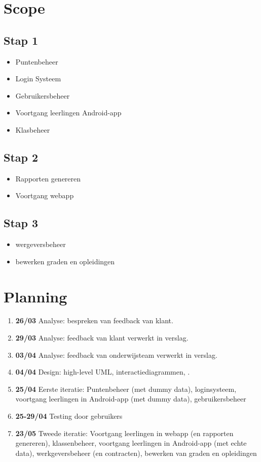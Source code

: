 \documentclass[a4paper]{article}
\begin{document}
\newpage
\section{Scope}
\subsection{Stap 1} %
\begin{itemize} 
    \item Puntenbeheer
    \item Login Systeem
    \item Gebruikersbeheer
    \item Voortgang leerlingen Android-app
    \item Klasbeheer
\end{itemize}
\subsection{Stap 2}
\begin{itemize}
    \item Rapporten genereren
    \item Voortgang webapp 
\end{itemize}
\subsection{Stap 3}
\begin{itemize}
    \item wergeversbeheer
    \item bewerken graden en opleidingen
\end{itemize}


\section{Planning}
\begin{enumerate}
    \item \textbf{26/03} Analyse: bespreken van feedback van klant.
    \item \textbf{29/03} Analyse: feedback van klant verwerkt in verslag.
    \item \textbf{03/04} Analyse: feedback van onderwijsteam verwerkt in verslag.
    \item \textbf{04/04} Design: high-level UML, interactiediagrammen, .
    \item \textbf{25/04} Eerste iteratie: Puntenbeheer (met dummy data), loginsysteem, voortgang leerlingen in Android-app (met dummy data), gebruikersbeheer
    \item \textbf{25-29/04} Testing door gebruikers
    \item \textbf{23/05} Tweede iteratie: Voortgang leerlingen in webapp (en rapporten genereren), klassenbeheer, voortgang leerlingen in Android-app (met echte data), werkgeversbeheer (en contracten), bewerken van graden en opleidingen
\end{enumerate}
\end{document}
